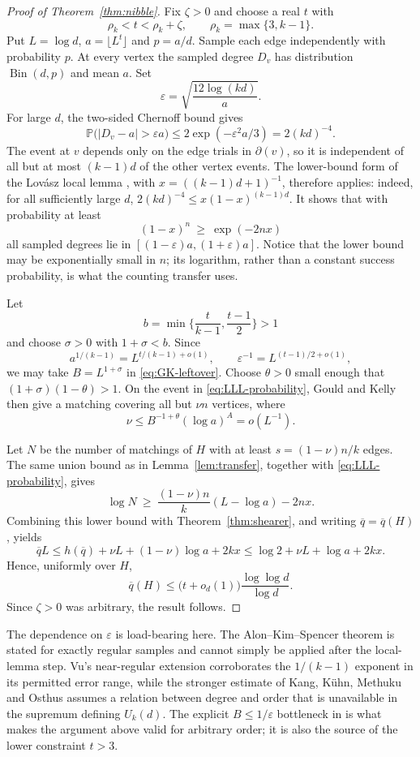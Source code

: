 \documentclass[11pt,a4paper]{amsart}
\theoremstyle{plain}
\theoremstyle{definition}
\theoremstyle{remark}
\newcommand{\PP}{\mathbb{P}}
\newcommand{\qbar}{\overline{q}}
\newcommand{\Bin}{\operatorname{Bin}}
\newcommand{\dg}{\partial}
\begin{document}
\begin{proof}[Proof of Theorem~\ref{thm:nibble}]
Fix $\zeta>0$ and choose a real $t$ with
\[
  \rho_k<t<\rho_k+\zeta,
  \qquad \rho_k=\max\{3,k-1\}.
\]
Put $L=\log d$, $a=\lfloor L^t\rfloor$ and $p=a/d$. Sample each edge independently
with probability $p$. At every vertex the sampled degree $D_v$ has distribution
$\Bin(d,p)$ and mean $a$. Set
\[
  \varepsilon=\sqrt{\frac{12\log(kd)}a}.
\]
For large $d$, the two-sided Chernoff bound gives
\[
  \PP\bigl(|D_v-a|>\varepsilon a\bigr)
  \le 2\exp(-\varepsilon^2a/3)=2(kd)^{-4}.
\]
The event at $v$ depends only on the edge trials in $\dg(v)$, so it is independent of
all but at most $(k-1)d$ of the other vertex events. The lower-bound form of the
Lov\'asz local lemma \cite[Chapter 5]{AlonSpencer}, with
$x=((k-1)d+1)^{-1}$, therefore applies: indeed, for all
sufficiently large $d$, $2(kd)^{-4}\le x(1-x)^{(k-1)d}$. It shows that with probability
at least
\begin{equation}
\label{eq:LLL-probability}
  (1-x)^n\ \ge\ \exp(-2nx)
\end{equation}
all sampled degrees lie in $[(1-\varepsilon)a,(1+\varepsilon)a]$. Notice that the
lower bound may be exponentially small in $n$; its logarithm, rather than a constant
success probability, is what the counting transfer uses.

Let
\[
  b=\min\biggl\{\frac{t}{k-1},\frac{t-1}{2}\biggr\}>1
\]
and choose $\sigma>0$ with $1+\sigma<b$. Since
\[
  a^{1/(k-1)}=L^{t/(k-1)+o(1)},
  \qquad
  \varepsilon^{-1}=L^{(t-1)/2+o(1)},
\]
we may take $B=L^{1+\sigma}$ in \eqref{eq:GK-leftover}. Choose $\theta>0$ small
enough that $(1+\sigma)(1-\theta)>1$. On the event in
\eqref{eq:LLL-probability}, Gould and Kelly then give a matching covering all but
$\nu n$ vertices, where
\[
  \nu\le B^{-1+\theta}(\log a)^A=o(L^{-1}).
\]

Let $N$ be the number of matchings of $H$ with at least
$s=(1-\nu)n/k$ edges. The same union bound as in Lemma~\ref{lem:transfer}, together
with \eqref{eq:LLL-probability}, gives
\[
  \log N\ \ge\ \frac{(1-\nu)n}{k}(L-\log a)-2nx.
\]
Combining this lower bound with Theorem~\ref{thm:shearer}, and writing
$\qbar=\qbar(H)$, yields
\[
  \qbar L
  \le h(\qbar)+\nu L+(1-\nu)\log a+2kx
  \le \log2+\nu L+\log a+2kx.
\]
Hence, uniformly over $H$,
\[
  \qbar(H)\le\bigl(t+o_d(1)\bigr)\frac{\log\log d}{\log d}.
\]
Since $\zeta>0$ was arbitrary, the result follows.
\end{proof}

The dependence on $\varepsilon$ is load-bearing here. The Alon--Kim--Spencer theorem
\cite{AlonKimSpencer} is stated for exactly regular samples and cannot simply be applied
after the local-lemma step. Vu's near-regular extension \cite{Vu} corroborates the
$1/(k-1)$ exponent in its permitted error range, while the stronger estimate of Kang,
K\"uhn, Methuku and Osthus \cite{KKMO} assumes a relation between degree and order that
is unavailable in the supremum defining $U_k(d)$. The explicit
$B\le1/\varepsilon$ bottleneck in \cite{GouldKelly} is what makes the argument above
valid for arbitrary order; it is also the source of the lower constraint $t>3$.
\end{document}
